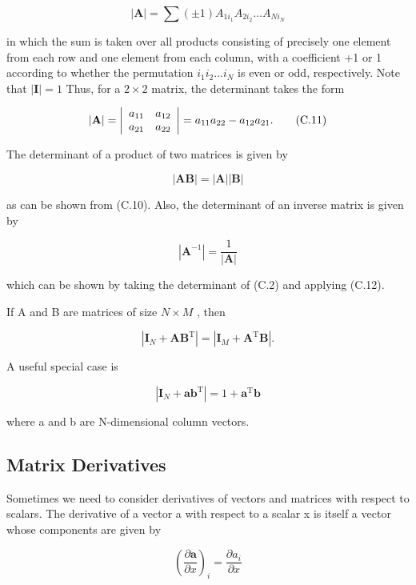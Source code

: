 \documentclass[
  10
]{article}
\begin{document}
\[
| \mathbf {A} | = \sum (\pm 1) A _ {1 i _ {1}} A _ {2 i _ {2}} \dots A _ {N i _ {N}}\tag{C.10}
\]

in which the sum is taken over all products consisting of precisely one
element from each row and one element from each column, with a
coefficient +1 or 1 according to whether the permutation
\(i _ { 1 } i _ { 2 } \dots i _ { N }\) is even or odd, respectively.
Note that \(| \mathbf { I } | = 1\) Thus, for a \(2 \times 2\) matrix,
the determinant takes the form

\[
| \mathbf {A} | = \left| \begin{array}{l l} a _ {1 1} & a _ {1 2} \\ a _ {2 1} & a _ {2 2} \end{array} \right| = a _ {1 1} a _ {2 2} - a _ {1 2} a _ {2 1}.\tag{C.11}
\]

The determinant of a product of two matrices is given by

\[
| \mathbf {A B} | = | \mathbf {A} | | \mathbf {B} |\tag{C.12}
\]

as can be shown from (C.10). Also, the determinant of an inverse matrix
is given by

\[
\left| \mathbf {A} ^ {- 1} \right| = \frac {1}{\left| \mathbf {A} \right|}\tag{C.13}
\]

which can be shown by taking the determinant of (C.2) and applying
(C.12).

If A and B are matrices of size \(N \times M\) , then

\[
\left| \mathbf {I} _ {N} + \mathbf {A B} ^ {\mathrm{T}} \right| = \left| \mathbf {I} _ {M} + \mathbf {A} ^ {\mathrm{T}} \mathbf {B} \right|.\tag{C.14}
\]

A useful special case is

\[
\left| \mathbf {I} _ {N} + \mathbf {a b} ^ {\mathrm{T}} \right| = 1 + \mathbf {a} ^ {\mathrm{T}} \mathbf {b}\tag{C.15}
\]

where a and b are N-dimensional column vectors.

\subsection{Matrix Derivatives}\label{matrix-derivatives}

Sometimes we need to consider derivatives of vectors and matrices with
respect to scalars. The derivative of a vector a with respect to a
scalar x is itself a vector whose components are given by

\[
\left(\frac {\partial \mathbf {a}}{\partial x}\right) _ {i} = \frac {\partial a _ {i}}{\partial x}\tag{C.16}
\]
\end{document}
